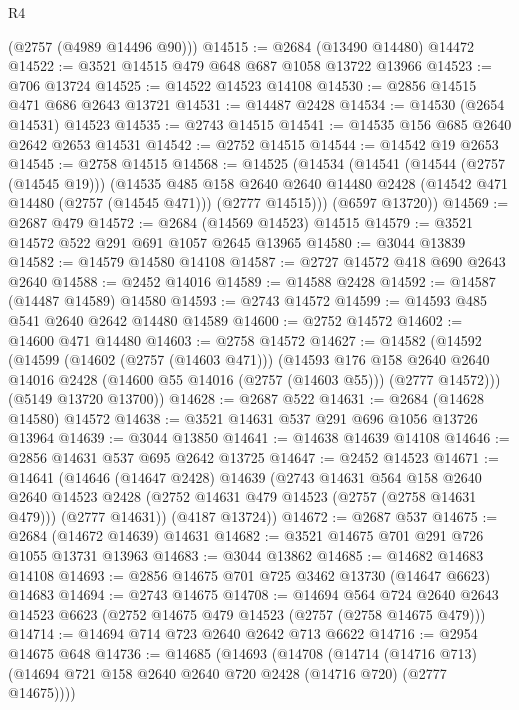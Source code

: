 \begin{lexlean}{R4}
\begin{coremodule}
      (@2757 (@4989 @14496 @90)))
@14515 := @2684 (@13490 @14480) @14472
@14522 := @3521 @14515 @479 @648 @687 @1058 @13722 @13966
@14523 := @706 @13724
@14525 := @14522 @14523 @14108
@14530 := @2856 @14515 @471 @686 @2643 @13721
@14531 := @14487 @2428
@14534 := @14530 (@2654 @14531) @14523
@14535 := @2743 @14515
@14541 := @14535 @156 @685 @2640 @2642 @2653 @14531
@14542 := @2752 @14515
@14544 := @14542 @19 @2653
@14545 := @2758 @14515
@14568 := @14525
    (@14534
      (@14541
        (@14544 (@2757 (@14545 @19)))
        (@14535
          @485
          @158
          @2640
          @2640
          @14480
          @2428
          (@14542 @471 @14480 (@2757 (@14545 @471)))
          (@2777 @14515)))
      (@6597 @13720))
@14569 := @2687 @479
@14572 := @2684 (@14569 @14523) @14515
@14579 := @3521 @14572 @522 @291 @691 @1057 @2645 @13965
@14580 := @3044 @13839
@14582 := @14579 @14580 @14108
@14587 := @2727 @14572 @418 @690 @2643 @2640
@14588 := @2452 @14016
@14589 := @14588 @2428
@14592 := @14587 (@14487 @14589) @14580
@14593 := @2743 @14572
@14599 := @14593 @485 @541 @2640 @2642 @14480 @14589
@14600 := @2752 @14572
@14602 := @14600 @471 @14480
@14603 := @2758 @14572
@14627 := @14582
    (@14592
      (@14599
        (@14602 (@2757 (@14603 @471)))
        (@14593
          @176
          @158
          @2640
          @2640
          @14016
          @2428
          (@14600 @55 @14016 (@2757 (@14603 @55)))
          (@2777 @14572)))
      (@5149 @13720 @13700))
@14628 := @2687 @522
@14631 := @2684 (@14628 @14580) @14572
@14638 := @3521 @14631 @537 @291 @696 @1056 @13726 @13964
@14639 := @3044 @13850
@14641 := @14638 @14639 @14108
@14646 := @2856 @14631 @537 @695 @2642 @13725
@14647 := @2452 @14523
@14671 := @14641
    (@14646
      (@14647 @2428)
      @14639
      (@2743
        @14631
        @564
        @158
        @2640
        @2640
        @14523
        @2428
        (@2752 @14631 @479 @14523 (@2757 (@2758 @14631 @479)))
        (@2777 @14631))
      (@4187 @13724))
@14672 := @2687 @537
@14675 := @2684 (@14672 @14639) @14631
@14682 := @3521 @14675 @701 @291 @726 @1055 @13731 @13963
@14683 := @3044 @13862
@14685 := @14682 @14683 @14108
@14693 := @2856 @14675 @701 @725 @3462 @13730 (@14647 @6623) @14683
@14694 := @2743 @14675
@14708 := @14694
    @564
    @724
    @2640
    @2643
    @14523
    @6623
    (@2752 @14675 @479 @14523 (@2757 (@2758 @14675 @479)))
@14714 := @14694 @714 @723 @2640 @2642 @713 @6622
@14716 := @2954 @14675 @648
@14736 := @14685
    (@14693
      (@14708
        (@14714
          (@14716 @713)
          (@14694 @721 @158 @2640 @2640 @720 @2428 (@14716 @720) (@2777 @14675))))

\end{coremodule}
\end{lexlean}
